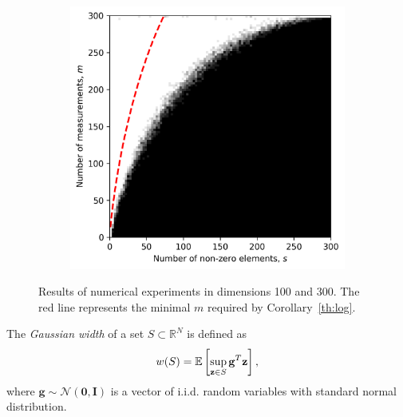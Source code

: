 \begin{figure}
\begin{subfigure}{0.5\linewidth}
        \includegraphics[width=\linewidth]{pictures/log_estimate300.png}
        \caption{}
    \end{subfigure}
    \caption{\centering Results of numerical experiments in dimensions 100 and 300. The red line represents the minimal $m$ required by
    Corollary~\ref{th:log}.}
    \label{fig:log}
\end{figure}

%

\begin{definition}
    The \textit{Gaussian width} of a set $S \subset \mathbb{R}^N$ is defined as
    \[ w(S) = \mathbb{E} \left[ \sup_{\mathbf{z} \in S} \mathbf{g}^T \mathbf{z} \right], \]
    where $\mathbf{g} \sim \mathcal{N}(\mathbf{0}, \mathbf{I})$ is a vector of i.i.d. random variables with standard normal distribution.
\end{definition}

